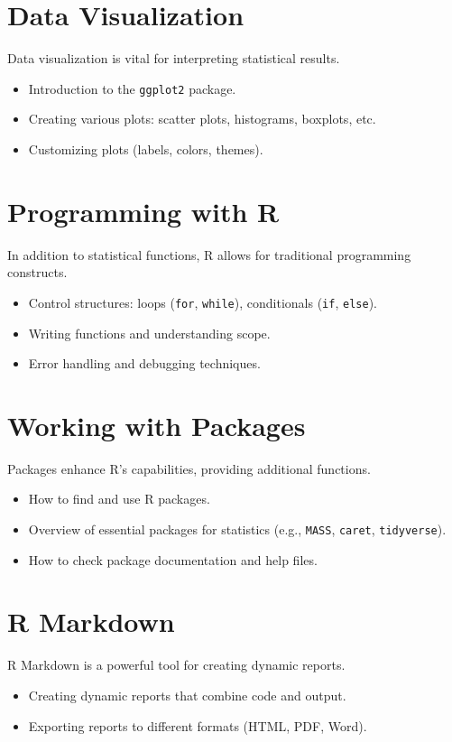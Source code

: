 \documentclass[12pt]{book}
\begin{document}
\section{Data Visualization}
Data visualization is vital for interpreting statistical results.
\begin{itemize}
    \item Introduction to the \texttt{ggplot2} package.
    \item Creating various plots: scatter plots, histograms, boxplots, etc.
    \item Customizing plots (labels, colors, themes).
\end{itemize}

\section{Programming with R}
In addition to statistical functions, R allows for traditional programming constructs.
\begin{itemize}
    \item Control structures: loops (\texttt{for}, \texttt{while}), conditionals (\texttt{if}, \texttt{else}).
    \item Writing functions and understanding scope.
    \item Error handling and debugging techniques.
\end{itemize}

\section{Working with Packages}
Packages enhance R's capabilities, providing additional functions.
\begin{itemize}
    \item How to find and use R packages.
    \item Overview of essential packages for statistics (e.g., \texttt{MASS}, \texttt{caret}, \texttt{tidyverse}).
    \item How to check package documentation and help files.
\end{itemize}

\section{R Markdown}
R Markdown is a powerful tool for creating dynamic reports.
\begin{itemize}
    \item Creating dynamic reports that combine code and output.
    \item Exporting reports to different formats (HTML, PDF, Word).
\end{itemize}
\end{document}
